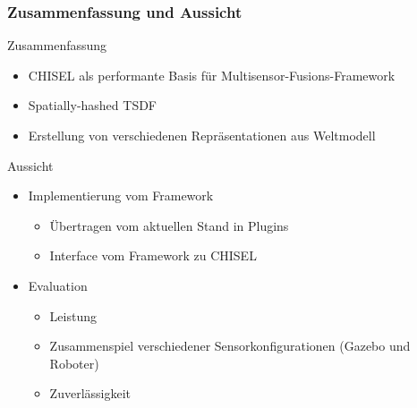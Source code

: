 \begin{frame}[c]
    \frametitle{Zusammenfassung und Aussicht}
      

    \begin{block}{Zusammenfassung}
      \begin{itemize}
       \item CHISEL als performante Basis für Multisensor-Fusions-Framework
       \item Spatially-hashed TSDF 
       \item Erstellung von verschiedenen Repräsentationen aus Weltmodell
      \end{itemize}

    \end{block}


      \begin{block}{Aussicht}
	\begin{itemize}
	  \item Implementierung vom Framework
	  \begin{itemize}
	   \item Übertragen vom aktuellen Stand in Plugins
	   \item Interface vom Framework zu CHISEL

	  \end{itemize}

	  \item Evaluation
	  \begin{itemize}
	   \item Leistung
	   \item Zusammenspiel verschiedener Sensorkonfigurationen (Gazebo und Roboter)
	   \item Zuverlässigkeit
	  \end{itemize}

	\end{itemize} 
      
      \end{block}
    
    

\end{frame}